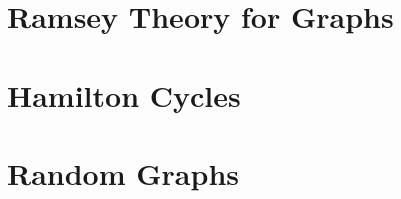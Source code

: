 \documentclass[dvipdfmx]{jarticle}
\begin{document}
\newpage

\section{Ramsey Theory for Graphs}























\newpage

\section{Hamilton Cycles}

















\newpage

\section{Random Graphs}





















\newpage
\end{document}

